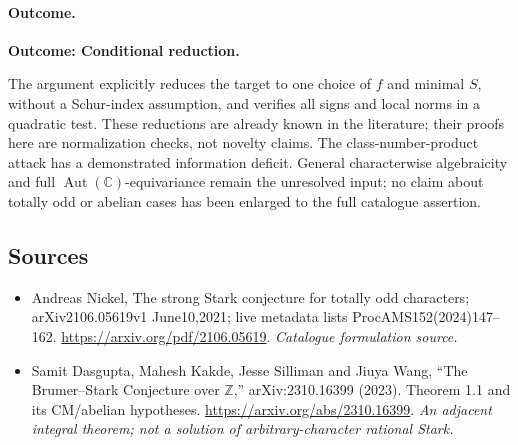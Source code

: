 \documentclass[11pt,a4paper]{article}
\newcommand{\Z}{\mathbb{Z}}
\newcommand{\C}{\mathbb{C}}
\numberwithin{equation}{section}
\begin{document}
\paragraph{Outcome.}
\textbf{Outcome: Conditional reduction.}

The argument explicitly reduces the target to one choice of $f$ and
minimal $S$, without a Schur-index assumption, and verifies all signs
and local norms in a quadratic test. These reductions are already
known in the literature; their proofs here are normalization checks,
not novelty claims. The class-number-product attack has a demonstrated
information deficit. General characterwise algebraicity and full
$\operatorname{Aut}(\C)$-equivariance remain the unresolved input; no
claim about totally odd or abelian cases has been enlarged to the full
catalogue assertion.
\subsection{Sources}
\begin{itemize}\raggedright
\item[\textnormal{[S1]}]\hypertarget{source:statement:1}{} Andreas Nickel, The strong Stark conjecture for totally odd characters; arXiv2106.05619v1 June10,2021; live metadata lists ProcAMS152(2024)147–162.
\url{https://arxiv.org/pdf/2106.05619}.
{\small\textit{Catalogue formulation source.}}
\item[\textnormal{[E1]}]\hypertarget{extra:statement:1}{} Samit Dasgupta, Mahesh Kakde, Jesse Silliman and Jiuya Wang, ``The Brumer--Stark Conjecture over $\Z$,'' arXiv:2310.16399 (2023). Theorem 1.1 and its CM/abelian hypotheses.
\url{https://arxiv.org/abs/2310.16399}.
{\small\textit{An adjacent integral theorem; not a solution of arbitrary-character rational Stark.}}
\end{itemize}
\end{document}
